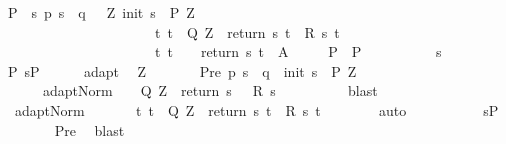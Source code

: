 \begin{isabellebody}
\ {\isachardoublequoteopen}P\ {\isasymsubseteq}\ {\isacharbraceleft}s{\isachardot}\ p\ s\ {\isacharequal}\ q\ {\isasymand}\ {\isacharparenleft}{\isasymexists}\ Z{\isachardot}\ init\ s\ {\isasymin}\ P{\isacharprime}\ Z\ {\isasymand}\ \isanewline
\ \ \ \ \ \ \ \ \ \ \ \ \ \ \ \ \ \ \ \ \ \ {\isacharparenleft}{\isasymforall}t{\isachardot}\ t\ {\isasymin}\ Q{\isacharprime}\ Z\ {\isasymlongrightarrow}\ return\ s\ t\ {\isasymin}\ R\ s\ t{\isacharparenright}\ {\isasymand}\isanewline
\ \ \ \ \ \ \ \ \ \ \ \ \ \ \ \ \ \ \ \ \ \ {\isacharparenleft}{\isasymforall}t{\isachardot}\ t\ {\isasymin}\ {\isacharbraceleft}{\isacharbraceright}\ {\isasymlongrightarrow}\ return\ s\ t\ {\isasymin}\ A{\isacharparenright}{\isacharparenright}{\isacharbraceright}{\isachardoublequoteclose}\isanewline
\ \ \ \ {\isacharparenleft}\ {\isachardoublequoteopen}P\ {\isasymsubseteq}\ {\isacharquery}P{\isacharprime}{\isachardoublequoteclose}{\isacharparenright}\isanewline
\ \ \isamarkupfalse%
\ \isanewline
\ \ \ \ \isamarkupfalse%
\ s\isanewline
\ \ \ \ \isamarkupfalse%
\ P{\isacharcolon}\ {\isachardoublequoteopen}s{\isasymin}P{\isachardoublequoteclose}\isanewline
\ \ \ \ \isamarkupfalse%
\ adapt\ \isamarkupfalse%
\ Z\ \isanewline
\ \ \ \ \ \ Pre{\isacharcolon}\ {\isachardoublequoteopen}p\ s\ {\isacharequal}\ q\ {\isasymand}\ init\ s\ {\isasymin}\ P{\isacharprime}\ Z{\isachardoublequoteclose}\ \isanewline
\ \ \ \ \ \ adapt{\isacharunderscore}Norm{\isacharcolon}\ {\isachardoublequoteopen}{\isasymforall}{\isasymtau}{\isachardot}\ {\isasymtau}\ {\isasymin}\ Q{\isacharprime}\ Z\ {\isasymlongrightarrow}\ return\ s\ {\isasymtau}\ {\isasymin}\ R\ s\ {\isasymtau}{\isachardoublequoteclose}\ \isanewline
\ \ \ \ \ \ \isamarkupfalse%
\ blast\isanewline
\ \ \ \ \isamarkupfalse%
\ \ adapt{\isacharunderscore}Norm\ \isanewline
\ \ \ \ \isamarkupfalse%
\ {\isachardoublequoteopen}{\isasymforall}t{\isachardot}\ t\ {\isasymin}\ Q{\isacharprime}\ Z\ {\isasymlongrightarrow}\ return\ s\ t\ {\isasymin}\ R\ s\ t{\isachardoublequoteclose}\isanewline
\ \ \ \ \ \ \isamarkupfalse%
\ auto\isanewline
\ \ \ \ \isamarkupfalse%
\isanewline
\ \ \ \ \isamarkupfalse%
\ {\isachardoublequoteopen}s{\isasymin}{\isacharquery}P{\isacharprime}{\isachardoublequoteclose}\isanewline
\ \ \ \ \ \ \isamarkupfalse%
\ Pre\ \isamarkupfalse%
\ blast\isanewline
\ \ \isamarkupfalse%

\end{isabellebody}
